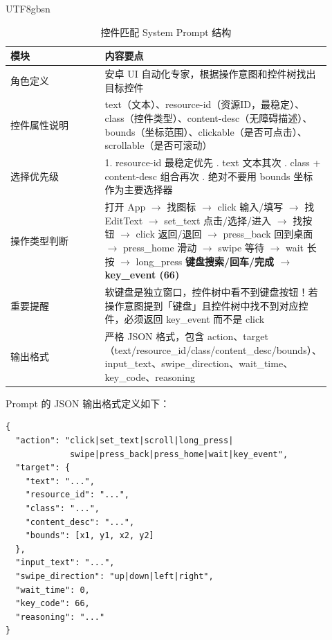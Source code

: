 \documentclass{article}
\begin{document}
\begin{CJK}{UTF8}{gbsn}
\begin{table}[h]
  \centering
  \caption{控件匹配 System Prompt 结构}
  \label{tab:prompt_structure}
  \begin{tabular}{p{0.3\linewidth}p{0.62\linewidth}}
    \toprule
    模块 & 内容要点 \\
    \midrule
    角色定义 & 安卓 UI 自动化专家，根据操作意图和控件树找出目标控件 \\
    \midrule
    控件属性说明 & text（文本）、resource-id（资源ID，最稳定）、class（控件类型）、content-desc（无障碍描述）、bounds（坐标范围）、clickable（是否可点击）、scrollable（是否可滚动） \\
    \midrule
    选择优先级 & 1. resource-id 最稳定优先 \newline 2. text 文本其次 \newline 3. class + content-desc 组合再次 \newline 4. 绝对不要用 bounds 坐标作为主要选择器 \\
    \midrule
    操作类型判断 & 打开 App $\rightarrow$ 找图标 $\rightarrow$ click \newline 输入/填写 $\rightarrow$ 找 EditText $\rightarrow$ set\_text \newline 点击/选择/进入 $\rightarrow$ 找按钮 $\rightarrow$ click \newline 返回/退回 $\rightarrow$ press\_back \newline 回到桌面 $\rightarrow$ press\_home \newline 滑动 $\rightarrow$ swipe \newline 等待 $\rightarrow$ wait \newline 长按 $\rightarrow$ long\_press \newline \textbf{键盘搜索/回车/完成 $\rightarrow$ key\_event (66)} \\
    \midrule
    重要提醒 & 软键盘是独立窗口，控件树中看不到键盘按钮！若操作意图提到「键盘」且控件树中找不到对应控件，必须返回 key\_event 而不是 click \\
    \midrule
    输出格式 & 严格 JSON 格式，包含 action、target（text/resource\_id/class/content\_desc/bounds）、input\_text、swipe\_direction、wait\_time、key\_code、reasoning \\
    \bottomrule
  \end{tabular}
\end{table}

Prompt 的 JSON 输出格式定义如下：

\begin{verbatim}
{
  "action": "click|set_text|scroll|long_press|
             swipe|press_back|press_home|wait|key_event",
  "target": {
    "text": "...",
    "resource_id": "...",
    "class": "...",
    "content_desc": "...",
    "bounds": [x1, y1, x2, y2]
  },
  "input_text": "...",
  "swipe_direction": "up|down|left|right",
  "wait_time": 0,
  "key_code": 66,
  "reasoning": "..."
}
\end{verbatim}


\end{CJK}
\end{document}
